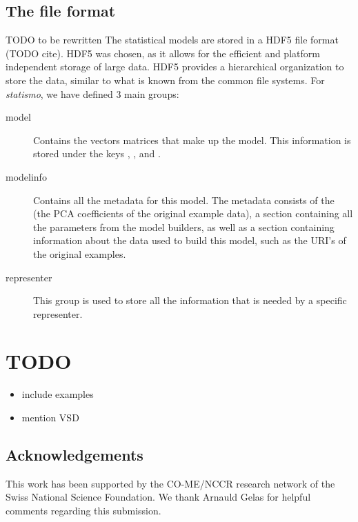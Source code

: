 \documentclass{InsightArticle}
\newcommand{\statismo}{\emph{statismo}\xspace}
\begin{document}
\subsection{The file format}
TODO to be rewritten
The statistical models are stored in a HDF5 file format (TODO cite). HDF5 was chosen, as it allows for the efficient and platform independent storage of large data. HDF5 provides a hierarchical organization to store the data, similar to what is known from the common file systems. For \statismo, we have defined 3 main groups:
\begin{description}
  \item [model] Contains the vectors matrices that make up the model. This information is stored under the keys , ,  and . 
  \item [modelinfo] Contains all the metadata for this model. The metadata consists of the  (the PCA coefficients of the original example data), a section  containing all the parameters from the model builders, as well as a section  containing information about the data used to build this model, such as the URI's of the original examples. 
  \item [representer]
    This group is used to store all the information that is needed by a specific representer. 
\end{description}

\section{TODO}
\begin{itemize}
  \item include examples
  \item mention VSD
\end{itemize}

\subsection*{Acknowledgements}
This work has been supported by the CO-ME/NCCR research network of
the Swiss National Science Foundation. We thank Arnauld Gelas for helpful comments regarding this
submission. 

%
%






%
%



\end{document}
